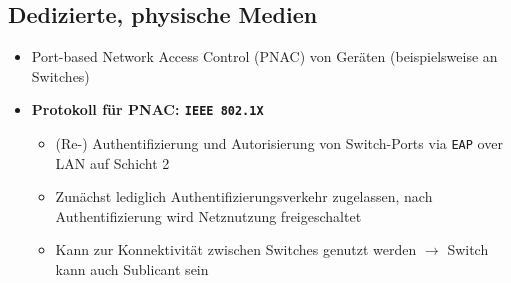 \subsection{Dedizierte, physische Medien}
\begin{itemize}
	\item Port-based Network Access Control (PNAC) von Geräten (beispielsweise an Switches)
	\item \textbf{Protokoll für PNAC: \texttt{IEEE 802.1X}}
	\begin{itemize}
		\item (Re-) Authentifizierung und Autorisierung von Switch-Ports via \texttt{EAP} over LAN auf Schicht 2
		\item Zunächst lediglich Authentifizierungsverkehr zugelassen, nach Authentifizierung wird Netznutzung freigeschaltet
		\item Kann zur Konnektivität zwischen Switches genutzt werden \(\rightarrow\) Switch kann auch Sublicant sein
	\end{itemize}
\end{itemize}

